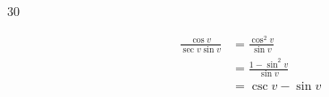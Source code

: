 \documentclass{exam}
\begin{document}
\begin{description}





      \item[30] 
        \begin{align*}
          \frac{\cos v}{\sec v \sin v} & = \frac{\cos^2 v}{\sin v} \\
                                       & = \frac{1 - \sin^2 v}{\sin v} \\
                                       & = \csc v - \sin v \\
        \end{align*}


\end{description}
\end{document}
